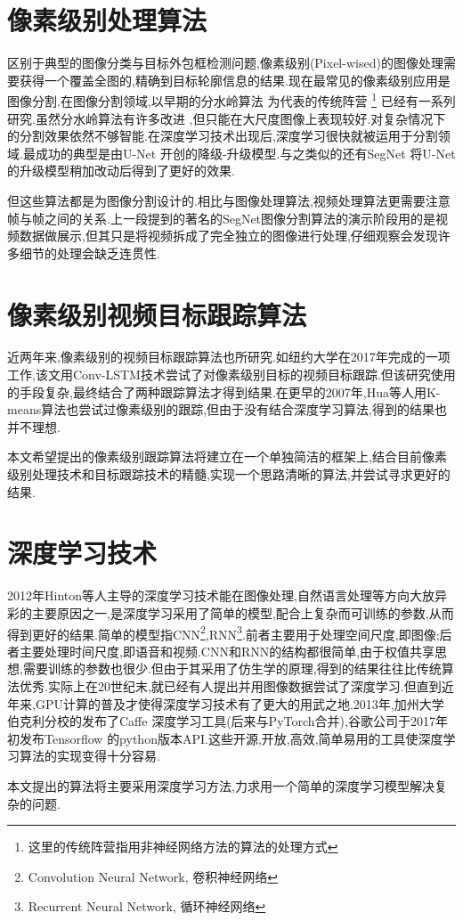 \section{像素级别处理算法}
区别于典型的图像分类与目标外包框检测问题,像素级别(Pixel-wised)的图像处理需要获得一个覆盖全图的,精确到目标轮廓信息的结果.现在最常见的像素级别应用是图像分割.在图像分割领域,以早期的分水岭算法
\supercite{olsen1997multi}
为代表的传统阵营
\footnote{这里的传统阵营指用非神经网络方法的算法的处理方式}
已经有一系列研究.虽然分水岭算法有许多改进
\supercite{grau2004improved}
,但只能在大尺度图像上表现较好.对复杂情况下的分割效果依然不够智能.在深度学习技术出现后,深度学习很快就被运用于分割领域.最成功的典型是由U-Net
\supercite{ronneberger2015u}
开创的降级-升级模型.与之类似的还有SegNet
\supercite{badrinarayanan2017segnet}
将U-Net的升级模型稍加改动后得到了更好的效果.
\par
但这些算法都是为图像分割设计的.相比与图像处理算法,视频处理算法更需要注意帧与帧之间的关系.上一段提到的著名的SegNet图像分割算法的演示阶段用的是视频数据做展示,但其只是将视频拆成了完全独立的图像进行处理,仔细观察会发现许多细节的处理会缺乏连贯性.

\section{像素级别视频目标跟踪算法}
近两年来,像素级别的视频目标跟踪算法也所研究.如纽约大学在2017年完成的一项工作\supercite{DBLP:journals/corr/abs-1711-07377},该文用Conv-LSTM技术\supercite{PatrauceanHC16}尝试了对像素级别目标的视频目标跟踪.但该研究使用的手段复杂,最终结合了两种跟踪算法才得到结果.在更早的2007年,Hua等人用K-means算法也尝试过像素级别的跟踪\supercite{hua2008k},但由于没有结合深度学习算法,得到的结果也并不理想.
\par
本文希望提出的像素级别跟踪算法将建立在一个单独简洁的框架上,结合目前像素级别处理技术和目标跟踪技术的精髓,实现一个思路清晰的算法,并尝试寻求更好的结果.

\section{深度学习技术}
2012年Hinton等人主导的深度学习技术能在图像处理,自然语言处理等方向大放异彩的主要原因之一,是深度学习采用了简单的模型,配合上复杂而可训练的参数,从而得到更好的结果.简单的模型指CNN\footnote{Convolution Neural Network, 卷积神经网络},RNN\footnote{Recurrent Neural Network, 循环神经网络}.前者主要用于处理空间尺度,即图像;后者主要处理时间尺度,即语音和视频.CNN和RNN的结构都很简单,由于权值共享思想,需要训练的参数也很少.但由于其采用了仿生学的原理,得到的结果往往比传统算法优秀.实际上在20世纪末,就已经有人提出并用图像数据尝试了深度学习\supercite{lecun1998gradient}.但直到近年来,GPU计算的普及才使得深度学习技术有了更大的用武之地.2013年,加州大学伯克利分校的发布了Caffe
\supercite{jia2014caffe}深度学习工具(后来与PyTorch\supercite{paszke2017automatic}合并),谷歌公司于2017年初发布Tensorflow
\supercite{abadi2016tensorflow}的python版本API.这些开源,开放,高效,简单易用的工具使深度学习算法的实现变得十分容易.
\par
本文提出的算法将主要采用深度学习方法,力求用一个简单的深度学习模型解决复杂的问题.

